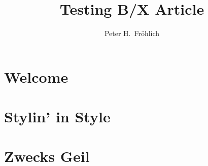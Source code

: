 \documentclass[11pt]{bxart}
\title{\textbf{Testing B/X Article}}
\author{Peter H.\ Fr\"ohlich}
\begin{document}
\maketitle
\tableofcontents

\section{Welcome}
\lipsum[1-10]

\section{Stylin' in Style}
\lipsum[11-20]

\section{Zwecks Geil}
\lipsum[21-28]
\end{document}
